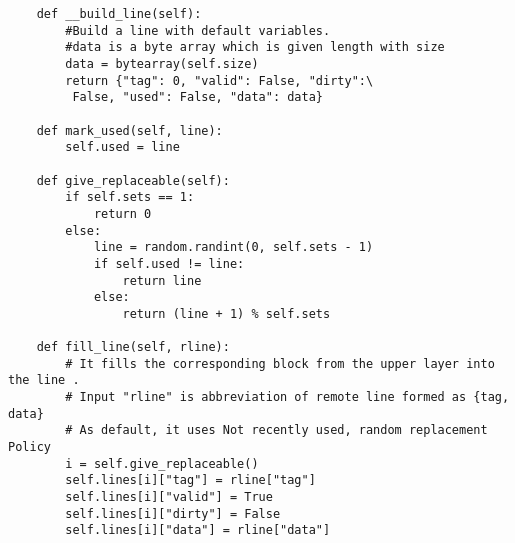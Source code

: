 \begin{lstlisting}
    def __build_line(self):
        #Build a line with default variables.
        #data is a byte array which is given length with size
        data = bytearray(self.size)
        return {"tag": 0, "valid": False, "dirty":\
         False, "used": False, "data": data}

    def mark_used(self, line):
        self.used = line

    def give_replaceable(self):
        if self.sets == 1:
            return 0
        else:
            line = random.randint(0, self.sets - 1)
            if self.used != line:
                return line
            else:
                return (line + 1) % self.sets

    def fill_line(self, rline):
        # It fills the corresponding block from the upper layer into the line .
        # Input "rline" is abbreviation of remote line formed as {tag, data}
        # As default, it uses Not recently used, random replacement Policy
        i = self.give_replaceable()
        self.lines[i]["tag"] = rline["tag"]
        self.lines[i]["valid"] = True
        self.lines[i]["dirty"] = False
        self.lines[i]["data"] = rline["data"]
\end{lstlisting}